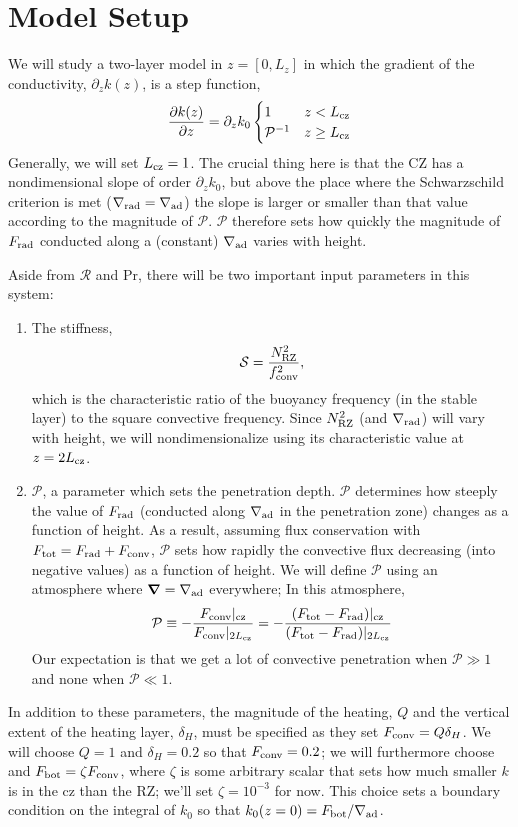 \documentclass[12pt,preprint]{article}
\newcommand{\gradrad}{\ensuremath{\nabla_{\rm{rad}}}}
\newcommand{\gradad}{\ensuremath{\nabla_{\rm{ad}}}}
\newcommand{\Ftot}{\ensuremath{F_{\rm{tot}}}}
\newcommand{\Frad}{\ensuremath{F_{\rm{rad}}}}
\newcommand{\Fconv}{\ensuremath{F_{\rm{conv}}}}
\newcommand{\mP}{\ensuremath{\mathcal{P}}}
\newcommand{\mR}{\ensuremath{\mathcal{R}}}
\newcommand\Pran{\ensuremath{\mathrm{Pr}}}
\renewcommand{\vec}[1]{\boldsymbol{#1}}
\newcommand{\grad}{\vec{\nabla}}
\begin{document}
\section{Model Setup}
We will study a two-layer model in $z = [0, L_z]$ in which the gradient of the conductivity, $\partial_z k(z)$, is a step function,
\begin{equation}
\frac{\partial k(z)}{\partial z} = \partial_z k_{0}\begin{cases}
1 & z < L_{\rm{cz}} \\
\mP^{-1} & z \geq L_{\rm{cz}}
\end{cases}
\end{equation}
Generally, we will set $L_{\rm{cz}} = 1$.
The crucial thing here is that the CZ has a nondimensional slope of order $\partial_z k_0$, but above the place where the Schwarzschild criterion is met ($\gradrad = \gradad$) the slope is larger or smaller than that value according to the magnitude of \mP.
$\mP$ therefore sets how quickly the magnitude of $\Frad$ conducted along a (constant) $\gradad$ varies with height.

Aside from $\mR$ and $\Pran$, there will be two important input parameters in this system:
\begin{enumerate}
\item The stiffness, 
\begin{equation}
\mathcal{S} = \frac{N_{\rm{RZ}}^2}{f_{\mathrm{conv}}^2},
\end{equation}
which is the characteristic ratio of the buoyancy frequency (in the stable layer) to the square convective frequency.
Since $N_{\rm{RZ}}^2$ (and $\gradrad$) will vary with height, we will nondimensionalize using its characteristic value at $z = 2 L_{\rm{cz}}$.
\item $\mathcal{P}$, a parameter which sets the penetration depth.
$\mathcal{P}$ determines how steeply the value of $\Frad$ (conducted along $\gradad$ in the penetration zone) changes as a function of height.
As a result, assuming flux conservation with $\Ftot = \Frad + \Fconv$, $\mP$ sets how rapidly the convective flux decreasing (into negative values) as a function of height.
We will define $\mP$ using an atmosphere where $\grad = \gradad$ everywhere; In this atmosphere,
\begin{equation}
\mP \equiv -\frac{\Fconv|_{\rm{cz}}}{\Fconv|_{2L_{\rm{cz}}}}
= -\frac{(\Ftot - \Frad)|_{\rm{cz}}}{(\Ftot - \Frad)|_{2L_{\rm{cz}}}}
\end{equation}
Our expectation is that we get a lot of convective penetration when $\mathcal{P} \gg 1$ and none when $\mathcal{P} \ll 1$.
\end{enumerate}
In addition to these parameters, the magnitude of the heating, $Q$ and the vertical extent of the heating layer, $\delta_H$, must be specified as they set $F_{\rm{conv}} = Q \delta_H$.
We will choose $Q = 1$ and $\delta_H = 0.2$ so that $F_{\rm{conv}} = 0.2$; we will furthermore choose and $F_{\rm{bot}} = \zeta F_{\rm{conv}}$, where $\zeta$ is some arbitrary scalar that sets how much smaller $k$ is in the cz than the RZ; we'll set $\zeta = 10^{-3}$ for now.
This choice sets a boundary condition on the integral of $k_0$ so that $k_0(z=0) = F_{\rm{bot}}/\gradad$.
\end{document}
